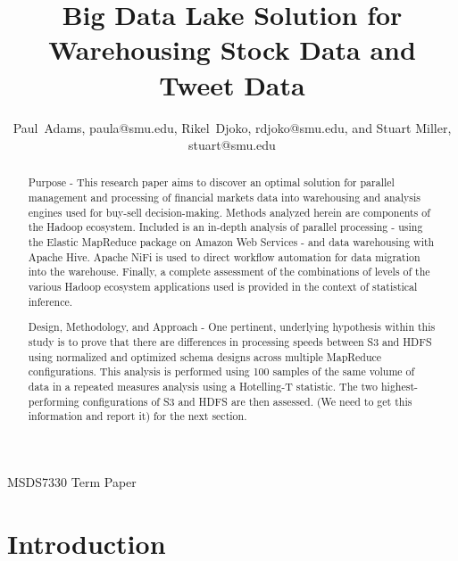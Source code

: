 \documentclass[journal]{IEEEtran}
\begin{document}
\title{Big Data Lake Solution for\\ 
    Warehousing Stock Data and Tweet Data}

\author{Paul~Adams, paula@smu.edu,
        Rikel~Djoko, rdjoko@smu.edu,
        and Stuart Miller, stuart@smu.edu}%

{MSDS7330 Term Paper}

\maketitle

\begin{abstract}

Purpose - This research paper aims to discover an optimal solution for parallel management and processing of financial markets data into  warehousing and analysis engines used for buy-sell decision-making. Methods analyzed herein are components of the Hadoop ecosystem. Included is an in-depth analysis of parallel processing - using the Elastic MapReduce package on Amazon Web Services - and data warehousing with Apache Hive. Apache NiFi is used to direct workflow automation for data migration into the warehouse. Finally, a complete assessment of the combinations of levels of the various Hadoop ecosystem applications used is provided in the context of statistical inference.

Design, Methodology, and Approach - One pertinent, underlying hypothesis within this study is to prove that there are differences in processing speeds between S3 and HDFS using normalized and optimized schema designs across multiple MapReduce configurations. This analysis is performed using 100 samples of the same volume of data in a repeated measures analysis using a Hotelling-T statistic. The two highest-performing configurations of S3 and HDFS are then assessed. (We need to get this information and report it) for the next section.

\end{abstract}

\section{Introduction}
\end{document}
